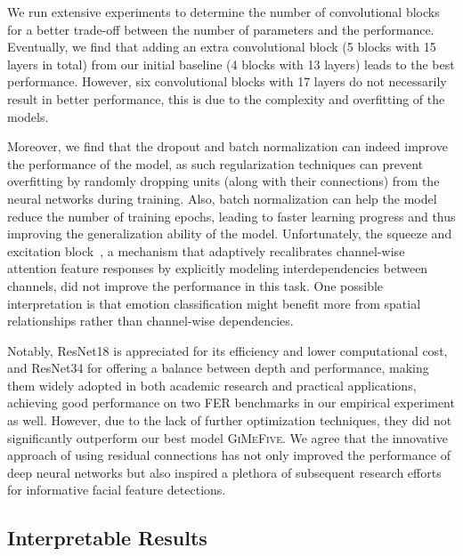 We run extensive experiments to determine the number of convolutional blocks for a better trade-off between the number of parameters and the performance. 
Eventually, we find that adding an extra convolutional block 
(5 blocks with 15 layers in total) from our initial baseline (4 blocks with 13 layers)
leads to the best performance. 
However, six convolutional blocks with 17 layers do not necessarily result in better performance, 
this is due to the complexity and overfitting of the models. 

Moreover, 
we find that the dropout and batch normalization can indeed improve the performance of the model, 
as such regularization techniques can prevent overfitting by randomly dropping units 
(along with their connections) from the neural networks during training. 
Also, %
batch normalization can help the model reduce the number of training epochs, 
leading to faster learning progress and thus improving the generalization ability of the model. 
Unfortunately, the squeeze and excitation block~\cite{HuSASW20}, 
a mechanism that adaptively recalibrates channel-wise attention feature responses by explicitly modeling interdependencies between channels, 
did not improve the performance in this task. 
One possible interpretation is that emotion classification might benefit more from spatial relationships rather than channel-wise dependencies. 

Notably, 
ResNet18 is appreciated for its efficiency and lower computational cost, 
and ResNet34 for offering a balance between depth and performance, 
making them widely adopted in both academic research and practical applications, 
achieving good performance on two FER benchmarks in our empirical experiment as well. 
However, due to the lack of further optimization techniques, %
they did not significantly outperform our best model \textsc{GiMeFive}. 
We agree that the innovative approach of using residual connections has not only improved the performance of deep neural networks 
but also inspired a plethora of subsequent research efforts for informative facial feature detections. %

\subsection{Interpretable Results}
\label{sec:evaluation:inter}

